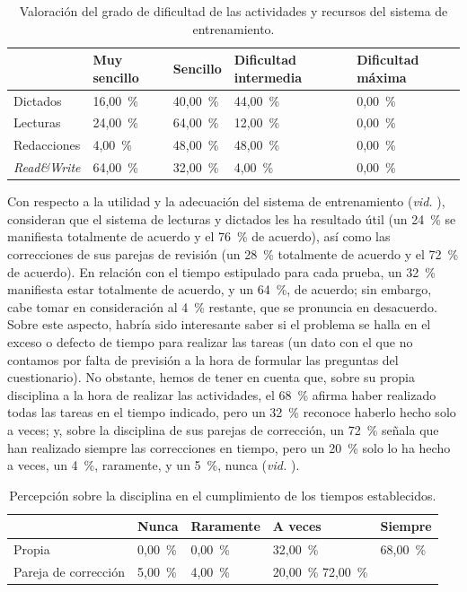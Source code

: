 \documentclass[spanish]{textolivre}
\begin{document}
\begin{table}[htbp]
\centering
\begin{threeparttable}
\caption{Valoración del grado de dificultad de las actividades y recursos del sistema de entrenamiento.}
\label{tb6}
\begin{tabular}{p{2.0cm} p{2.0cm} p{2.0cm} p{2.0cm} p{2.0cm}}
\toprule
& Muy sencillo & Sencillo & Dificultad intermedia & Dificultad máxima \\ 
\midrule
Dictados & 16,00~\% & 40,00~\% & 44,00~\% & 0,00~\% \\
Lecturas & 24,00~\% & 64,00~\% & 12,00~\% & 0,00~\% \\
Redacciones & 4,00~\% & 48,00~\% & 48,00~\% & 0,00~\% \\
\textit{Read\&Write} & 64,00~\% & 32,00~\% & 4,00~\% & 0,00~\% \\
\bottomrule
\end{tabular}
\end{threeparttable}
\end{table}

Con respecto a la utilidad y la adecuación del sistema de entrenamiento (\textit{vid.} ), consideran que el sistema de lecturas y dictados les ha resultado útil (un 24~\% se manifiesta totalmente de acuerdo y el 76~\% de acuerdo), así como las correcciones de sus parejas de revisión (un 28~\% totalmente de acuerdo y el 72~\% de acuerdo). En relación con el tiempo estipulado para cada prueba, un 32~\% manifiesta estar totalmente de acuerdo, y un 64~\%, de acuerdo; sin embargo, cabe tomar en consideración al 4~\% restante, que se pronuncia en desacuerdo. Sobre este aspecto, habría sido interesante saber si el problema se halla en el exceso o defecto de tiempo para realizar las tareas (un dato con el que no contamos por falta de previsión a la hora de formular las preguntas del cuestionario). No obstante, hemos de tener en cuenta que, sobre su propia disciplina a la hora de realizar las actividades, el 68~\% afirma haber realizado todas las tareas en el tiempo indicado, pero un 32~\% reconoce haberlo hecho solo a veces; y, sobre la disciplina de sus parejas de corrección, un 72~\% señala que han realizado siempre las correcciones en tiempo, pero un 20~\% solo lo ha hecho a veces, un 4~\%, raramente, y un 5~\%, nunca (\textit{vid.} ).

\begin{table}[htbp]
\centering
\begin{threeparttable}
\caption{Percepción sobre la disciplina en el cumplimiento de los tiempos establecidos.}
\label{tb7}
\begin{tabular}{lllll}
\toprule
& Nunca & Raramente & A veces & Siempre \\ 
\midrule
Propia & 0,00~\% & 0,00~\% & 32,00~\% & 68,00~\% \\
Pareja de corrección & 5,00~\% & 4,00~\% & 20,00~\% 72,00~\% \\
\bottomrule
\end{tabular}
\end{threeparttable}
\end{table}
\end{document}
